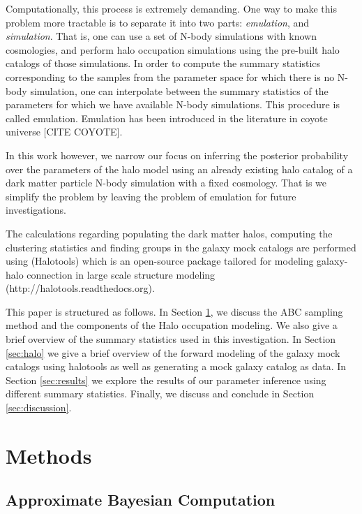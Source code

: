 \documentclass[12pt, preprint]{aastex}
\begin{document}
Computationally, this process is extremely demanding. One way to make this problem more tractable is to separate it into two parts: \emph{emulation}, and \emph{simulation}. That is, one can use a set of N-body simulations with known cosmologies, and perform halo occupation simulations using the pre-built halo catalogs of those simulations. In order to compute the summary statistics corresponding to the samples from the parameter space for which there is no N-body simulation, one can interpolate between the summary statistics of the parameters for which we have available N-body simulations. This procedure is called emulation. Emulation has been introduced in the literature in coyote universe [CITE COYOTE].

In this work however, we narrow our focus on inferring the posterior probability over the parameters of the halo model using an already existing halo catalog of a dark matter particle N-body simulation with a fixed cosmology. That is we simplify the problem by leaving the problem of emulation for future investigations.

The calculations regarding populating the dark matter halos, computing the clustering statistics and finding groups in the galaxy mock catalogs are performed using ({\selectfont Halotools}) which is an open-source package tailored for modeling galaxy-halo connection in large scale structure modeling ({\selectfont http://halotools.readthedocs.org}).

This paper is structured as follows. In Section \ref{sec:method},
we discuss the ABC sampling method and the components of the Halo occupation modeling. We also give a brief overview of the summary statistics used in this investigation. In Section \ref{sec:halo} we give a brief overview of the forward modeling of the galaxy mock catalogs using halotools as well as generating a mock galaxy catalog as data. In Section \ref{sec:results} we explore the results of our parameter inference using different summary statistics. Finally, we discuss and conclude in Section \ref{sec:discussion}.

\section{Methods}\label{sec:method}
\subsection{Approximate Bayesian Computation} \label{sec:abc}
\end{document}
